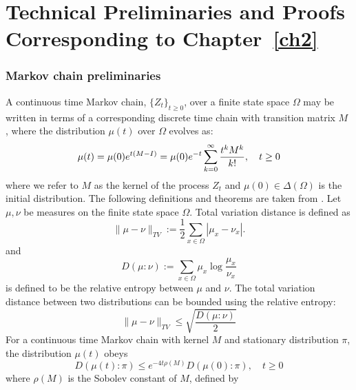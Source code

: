 \chapter{Technical Preliminaries and Proofs Corresponding to Chapter~\ref{ch2}}


\subsection{Markov chain preliminaries}\label{a:MchainPrelims}

A continuous time Markov chain, $\{Z_t\}_{t\geq 0}$, over a finite state space $\Omega$ may be written in terms of a corresponding discrete time chain with transition matrix $M$ \cite{Montenegro2006}, where the distribution $\mu(t)$ over $\Omega$ evolves as:\begin{equation}\label{e:contin time chain}
\mu(t) = \mu(0)e^{t(M-I)} = \mu(0)e^{-t}\sum_{k=0}^\infty {t^kM^k\over k!},\quad t\geq 0
\end{equation}
\normalsize
%
where we refer to $M$ as the kernel of the process $Z_t$ and $\mu(0) \in \Delta(\Omega)$ is the initial distribution.  
%
%
The following definitions and theorems are taken from \cite{Shah2010, Montenegro2006}.  Let $\mu,\nu$ be measures on the finite state space $\Omega.$  Total variation distance is defined as 
\begin{equation}\|\mu - \nu\|_{TV} := \frac{1}{2}\sum_{x\in \Omega}|\mu_x - \nu_x|.\end{equation}
and 
\begin{equation}D(\mu:\nu) := \sum_{x\in\Omega}\mu_x\log\frac{\mu_x}{\nu_x}\end{equation}
is defined to be the relative entropy between $\mu$ and $\nu$. The total variation distance between two distributions can be bounded using the relative entropy: 
\begin{equation}\label{measure ineq}\|\mu - \nu\|_{TV}\leq \sqrt{\frac{D(\mu:\nu)}{2}}\end{equation}
For a continuous time Markov chain with kernel $M$ and stationary distribution $\pi$, the distribution $\mu(t)$ obeys
\begin{equation}\label{e:entropy decay}
D(\mu(t):\pi)\leq e^{-4t\rho(M)}D(\mu(0):\pi),\quad t\geq 0
\end{equation}
where $\rho(M)$ is the Sobolev constant of $M$, defined by 
